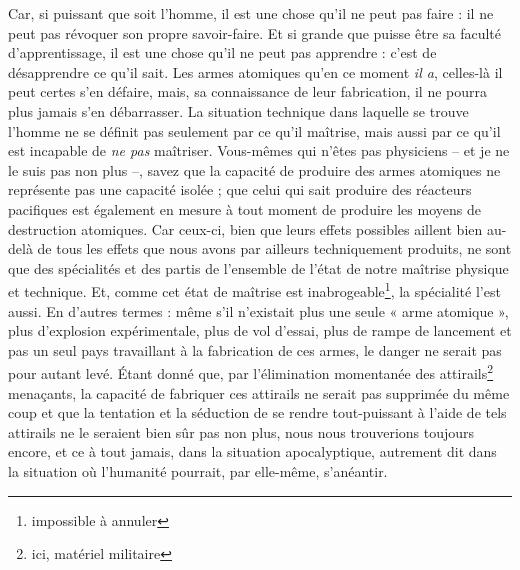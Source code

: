 	{
	
Car, si puissant que soit l’homme, il est une chose qu’il ne peut pas faire : il ne peut pas révoquer son propre savoir-faire. Et si grande que puisse être sa faculté d’apprentissage, il est une chose qu’il ne peut pas apprendre : c’est de désapprendre ce qu’il sait. Les armes atomiques qu’en ce moment \emph{il a}, celles-là il peut certes s’en défaire, mais, sa connaissance de leur fabrication, il ne pourra plus jamais s’en débarrasser. La situation technique dans laquelle se trouve l’homme ne se définit pas seulement par ce qu’il maîtrise, mais aussi par ce qu’il est incapable de \emph{ne pas} maîtriser. Vous-mêmes qui n’êtes pas physiciens – et je ne le suis pas non plus –, savez que la capacité de produire des armes atomiques ne représente pas une capacité isolée ; que celui qui sait produire des réacteurs pacifiques est également en mesure à tout moment de produire les moyens de destruction atomiques. Car ceux-ci, bien que leurs effets possibles aillent bien au-delà de tous les effets que nous avons par ailleurs techniquement produits, ne sont que des spécialités et des partis de l’ensemble de l’état de notre maîtrise physique et technique. Et, comme cet état de maîtrise est inabrogeable\footnote{impossible à annuler}, la spécialité l’est aussi. En d’autres termes : même s’il n’existait plus une seule « arme atomique », plus d’explosion expérimentale, plus de vol d’essai, plus de rampe de lancement et pas un seul pays travaillant à la fabrication de ces armes, le danger ne serait pas pour autant levé. Étant donné que, par l’élimination momentanée des attirails\footnote{ici, matériel militaire} menaçants, la capacité de fabriquer ces attirails ne serait pas supprimée du même coup et que la tentation et la séduction de se rendre tout-puissant à l’aide de tels attirails ne le seraient bien sûr pas non plus, nous nous trouverions toujours encore, et ce à tout jamais, dans la situation apocalyptique, autrement dit dans la situation où l’humanité pourrait, par elle-même, s’anéantir.
}


